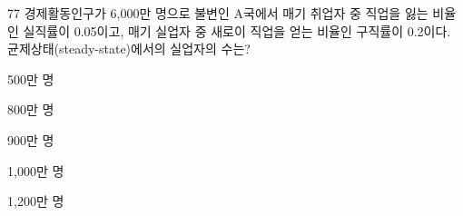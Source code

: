\begin{question}{77}
경제활동인구가 6,000만 명으로 불변인 A국에서 매기 취업자 중 직업을 잃는 비율인 실직률이 0.05이고, 매기 실업자 중 새로이 직업을 얻는 비율인 구직률이 0.2이다. 균제상태(steady-state)에서의 실업자의 수는?
\begin{choices}
  \item 500만 명
  \item 800만 명
  \item 900만 명
  \item 1,000만 명
  \item 1,200만 명
\end{choices}
\end{question}
